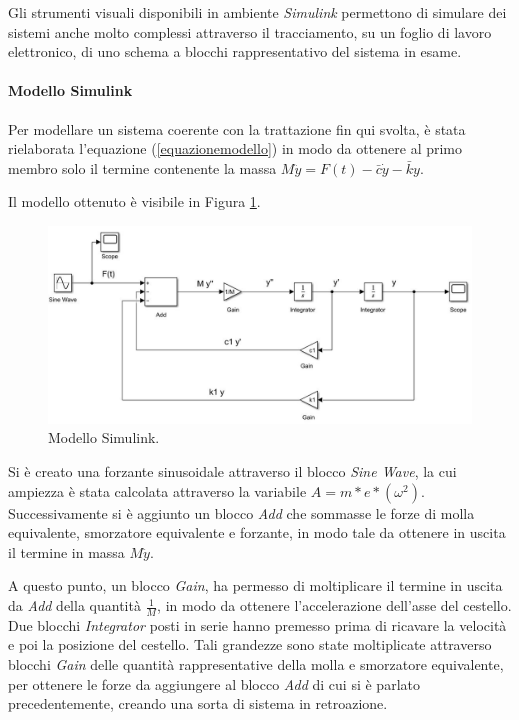  Gli  strumenti visuali disponibili in ambiente \textit{Simulink} permettono di  simulare  dei sistemi  anche  molto  complessi attraverso il tracciamento, su  un  foglio  di  lavoro  elettronico, di  uno  schema  a  blocchi  rappresentativo del sistema in esame.
 
 \paragraph{Modello Simulink} Per modellare un sistema coerente con la trattazione fin qui svolta, è stata rielaborata l'equazione (\ref{equazionemodello}) in modo da ottenere al primo membro solo il termine contenente la massa $M\ddot y=F(t)-\bar c \dot y-\bar k y$.
 
 Il modello ottenuto è visibile in Figura \ref{ModelloSimulink}.
 \begin{figure}[ht]
    \centering
    \includegraphics[width=\textwidth]{Modello simulink.JPG}
    \caption{Modello Simulink.}
    \label{ModelloSimulink}
\end{figure}

Si è creato una forzante sinusoidale attraverso il blocco \textit{Sine Wave}, la cui ampiezza è stata calcolata attraverso la variabile $A=m*e*(\omega^2)$. Successivamente si è aggiunto un blocco \textit{Add} che sommasse le forze di molla equivalente, smorzatore equivalente e forzante, in modo tale da ottenere in uscita il termine in massa $M\ddot y$. 

A questo punto, un blocco \textit{Gain}, ha permesso di moltiplicare il termine in uscita da \textit{Add} della quantità $\frac{1}{M}$, in modo da ottenere l'accelerazione dell'asse del cestello. Due blocchi \textit{Integrator} posti in serie hanno premesso prima di ricavare la velocità e poi la posizione del cestello. Tali grandezze sono state moltiplicate attraverso blocchi \textit{Gain} delle quantità rappresentative della molla e smorzatore equivalente, per ottenere le forze da aggiungere al blocco \textit{Add} di cui si è parlato precedentemente, creando una sorta di sistema in retroazione. 

